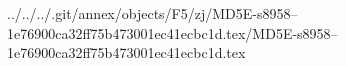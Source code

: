 ../../../.git/annex/objects/F5/zj/MD5E-s8958--1e76900ca32ff75b473001ec41ecbc1d.tex/MD5E-s8958--1e76900ca32ff75b473001ec41ecbc1d.tex